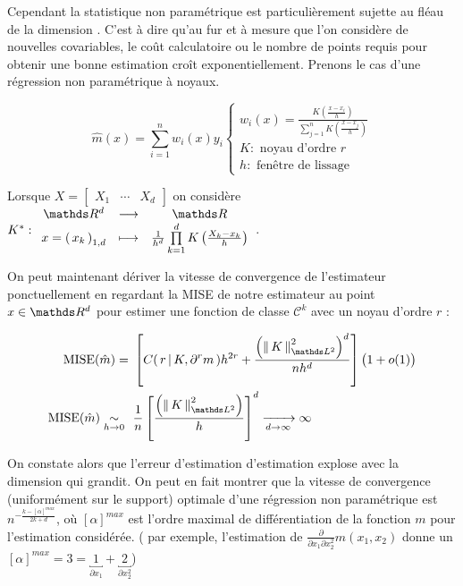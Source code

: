 \bigskip

Cependant la statistique non paramétrique est particulièrement sujette au \og fléau de la dimension \fg. C'est à dire qu'au fur et à mesure que l'on considère de nouvelles covariables, le coût calculatoire ou le nombre de points requis pour obtenir une bonne estimation croît exponentiellement. Prenons le cas d'une régression non paramétrique à noyaux.

\begin{equation*}
    \hat m(x) = \sum\limits_{i=1}^n w_i(x) y_i \begin{cases}
        w_i(x) = \displaystyle\frac{K\left(\frac{x - x_i}{h}\right)}{\sum\limits_{j=1}^n K\left(\frac{x - x_j}{h}\right)} \\
        K : \text{ noyau d'ordre } r\\
        h : \text{ fenêtre de lissage }
    \end{cases}
\end{equation*}

Lorsque $X = \begin{bmatrix} X_1 & \cdots & X_d \end{bmatrix}$ on considère $K^* : \func{\R d}{\grandR}{x = \famfinie[k] x 1 d} {\frac 1 {h^d} \prod\limits_{k=1}^d K \left( \frac{X_k - x_k}{h} \right)}$.

\bigskip

\noindent On peut maintenant dériver la vitesse de convergence de l'estimateur ponctuellement en regardant la MISE de notre estimateur au point $x \in \R d$ pour estimer une fonction de classe $\mathcal C^k$ avec un noyau d'ordre $r$ :

\begin{align}
    \operatorname{MISE}(\hat m) = \ & \left[ C( \, r \, | \,  {K, \partial^rm} \,)h^{2r} + \frac{\left(\norme{\mathds L^2}{K}^2\right)^d}{nh^d} \right]\bigl( 1 + o(1)\bigr)
    \\
    \operatorname{MISE}(\hat m)  \underset{h \rightarrow 0}{\sim} \ \ & \frac 1 n \left[ \frac{\left(\norme{\mathds L^2}{K}^2\right)}{h} \right]^d \tend d \infty \infty
\end{align}

On constate alors que l'erreur d'estimation d'estimation explose avec la dimension qui grandit.
On peut en fait montrer que la vitesse de convergence (uniformément sur le support) optimale d'une régression non paramétrique est $\displaystyle n^{- \frac{k-[\alpha]^{max}}{2k + d}}$\cite{10.1214/aos/1176345969}, où $[\alpha]^{max}$ est l'ordre maximal de différentiation de la fonction $m$ pour l'estimation considérée. ( par exemple, l'estimation de $\frac{\partial}{\partial x_1 \partial x_2^2} m(x_1, x_2)$ donne un $[\alpha]^{max} = 3 = \underbracket{ \ 1 \ }_{\partial x_1} + \underbracket{\ 2 \ }_{\partial x_2^2}$)

